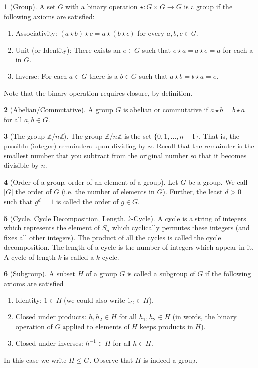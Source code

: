 \documentclass[12pt]{article}
\theoremstyle{definition}
\newtheorem{definition}{\color{NavyBlue}{\textbf{Definition}}}
\begin{document}
\begin{definition}[Group]
A set $G$ with a binary operation $\star: G \times G \rightarrow G$ is a group if the following axioms are satisfied:
\begin{enumerate}
\item Associativity: $(a \star b) \star c = a \star (b \star c)$ for every $a,b,c \in G$.
\item Unit (or Identity): There exists an $e \in G$ such that $e \star a = a \star e = a$ for each a in $G$.
\item Inverse: For each $a \in G$ there is a $b \in G$ such that $a \star b = b \star a = e$.
\end{enumerate}
Note that the binary operation requires closure, by definition.
\end{definition}

\begin{definition}[Abelian/Commutative]
A group $G$ is abelian or commutative if $a \star b = b \star a$ for all $a,b \in G$.
\end{definition}

\begin{definition}[The group $\mathbb{Z} / n \mathbb{Z}$]
The group $\mathbb{Z} / n \mathbb{Z}$ is the set $\{0,1,\ldots,n-1\}$. That is, the possible (integer) remainders upon dividing by $n$. Recall that the remainder is the smallest number that you subtract from the original number so that it becomes divisible by $n$.
\end{definition}

\begin{definition}[Order of a group, order of an element of a group]
Let $G$ be a group. We call $|G|$ the order of $G$ (i.e. the number of elements in $G$). Further, the least $d >0$ such that $g^d = 1$ is called the order of $g \in G$.
\end{definition}

\begin{definition}[Cycle, Cycle Decomposition, Length, $k$-Cycle]
A cycle is a string of integers which represents the element of $S_n$ which cyclically permutes these integers (and fixes all other integers). The product of all the cycles is called the cycle decomposition. The length of a cycle is the number of integers which appear in it. A cycle of length $k$ is called a $k$-cycle.
\end{definition}

\begin{definition}[Subgroup]
A subset $H$ of a group $G$ is called a subgroup of $G$ if the following axioms are satisfied
\begin{enumerate}
\item Identity: $1 \in H$ (we could also write $1_G \in H$).
\item Closed under products: $h_1 h_2 \in H$ for all $h_1, h_2 \in H$ (in words, the binary operation of $G$ applied to elements of $H$ keeps products in $H$).
\item Closed under inverses: $h^{-1} \in H$ for all $h\in H$.
\end{enumerate}
In this case we write $H \leq G$. Observe that $H$ is indeed a group.
\end{definition}
\end{document}
